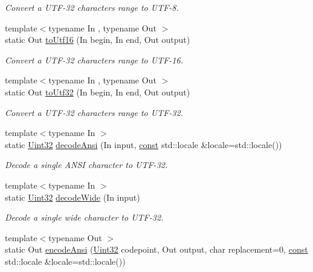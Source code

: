 \begin{DoxyCompactItemize}
\begin{DoxyCompactList}\small\item\em Convert a U\-T\-F-\/32 characters range to U\-T\-F-\/8. \end{DoxyCompactList}\item 
{\footnotesize template$<$typename In , typename Out $>$ }\\static Out \hyperlink{classsf_1_1_utf_3_0132_01_4_a3f97efb599ad237af06f076f3fcfa354}{to\-Utf16} (In begin, In end, Out output)
\begin{DoxyCompactList}\small\item\em Convert a U\-T\-F-\/32 characters range to U\-T\-F-\/16. \end{DoxyCompactList}\item 
{\footnotesize template$<$typename In , typename Out $>$ }\\static Out \hyperlink{classsf_1_1_utf_3_0132_01_4_abd7c1e80791c80c4d78257440de96140}{to\-Utf32} (In begin, In end, Out output)
\begin{DoxyCompactList}\small\item\em Convert a U\-T\-F-\/32 characters range to U\-T\-F-\/32. \end{DoxyCompactList}\item 
{\footnotesize template$<$typename In $>$ }\\static \hyperlink{namespacesf_aa746fb1ddef4410bddf198ebb27e727c}{Uint32} \hyperlink{classsf_1_1_utf_3_0132_01_4_a68346ea833f88267a7c739d4d96fb86f}{decode\-Ansi} (In input, \hyperlink{term__entry_8h_a57bd63ce7f9a353488880e3de6692d5a}{const} std\-::locale \&locale=std\-::locale())
\begin{DoxyCompactList}\small\item\em Decode a single A\-N\-S\-I character to U\-T\-F-\/32. \end{DoxyCompactList}\item 
{\footnotesize template$<$typename In $>$ }\\static \hyperlink{namespacesf_aa746fb1ddef4410bddf198ebb27e727c}{Uint32} \hyperlink{classsf_1_1_utf_3_0132_01_4_a043fe25f5f4dbc205e78e6f1d99840dc}{decode\-Wide} (In input)
\begin{DoxyCompactList}\small\item\em Decode a single wide character to U\-T\-F-\/32. \end{DoxyCompactList}\item 
{\footnotesize template$<$typename Out $>$ }\\static Out \hyperlink{classsf_1_1_utf_3_0132_01_4_af6590226a071076ca22d818573a16ded}{encode\-Ansi} (\hyperlink{namespacesf_aa746fb1ddef4410bddf198ebb27e727c}{Uint32} codepoint, Out output, char replacement=0, \hyperlink{term__entry_8h_a57bd63ce7f9a353488880e3de6692d5a}{const} std\-::locale \&locale=std\-::locale())

\end{DoxyCompactItemize}
